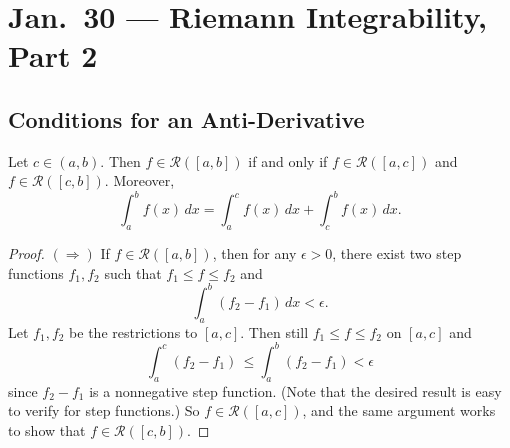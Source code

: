 \chapter{Jan.~30 --- Riemann Integrability, Part 2}

\section{Conditions for an Anti-Derivative}
\begin{lemma}
  \label{lem:split-integral}
  Let $c \in (a, b)$. Then $f \in \mathcal{R}([a, b])$ if and only if $f \in \mathcal{R}([a, c])$ and $f \in \mathcal{R}([c, b])$. Moreover,
  \[
    \int_a^b f(x) \, dx = \int_a^c f(x) \, dx + \int_c^b f(x) \, dx. \tag{$*$}
  \]
\end{lemma}

\begin{proof}
  $(\Rightarrow)$ If $f \in \mathcal{R}([a, b])$, then
  for any $\epsilon > 0$, there exist two step
  functions $f_1, f_2$ such that $f_1 \le f \le f_2$
  and
  \[
    \int_a^b (f_2 - f_1) \, dx < \epsilon.
  \]
  Let $f_1, f_2$ be the restrictions to $[a, c]$.
  Then still $f_1 \le f \le f_2$ on $[a, c]$ and
  \[
    \int_a^c (f_2 - f_1)\, \le
    \int_a^b (f_2 - f_1) < \epsilon
  \]
  since $f_2 - f_1$ is a nonnegative step function. (Note
  that the desired result is easy to verify for step
  functions.)
  So $f \in \mathcal{R}([a, c])$, and the same
  argument works to show that $f \in \mathcal{R}([c, b])$.


\end{proof}
